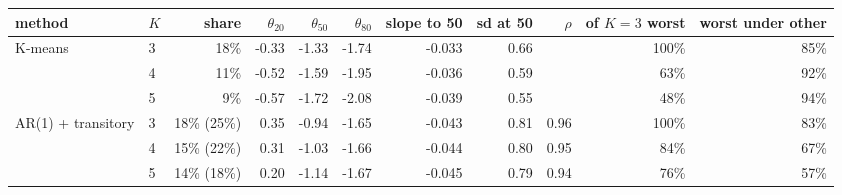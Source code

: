 \begin{tabular}{llrrrrrrrrr}
\toprule
method & $K$ & share & $\theta_{20}$ & $\theta_{50}$ & $\theta_{80}$ & slope to 50 & sd at 50 & $\rho$ & of $K{=}3$ worst & worst under other \\
\midrule
K-means & 3 & 18\% & -0.33 & -1.33 & -1.74 & -0.033 & 0.66 &  & 100\% & 85\% \\
 & 4 & 11\% & -0.52 & -1.59 & -1.95 & -0.036 & 0.59 &  & 63\% & 92\% \\
 & 5 & 9\% & -0.57 & -1.72 & -2.08 & -0.039 & 0.55 &  & 48\% & 94\% \\
\addlinespace
AR(1) + transitory & 3 & 18\% (25\%) & 0.35 & -0.94 & -1.65 & -0.043 & 0.81 & 0.96 & 100\% & 83\% \\
 & 4 & 15\% (22\%) & 0.31 & -1.03 & -1.66 & -0.044 & 0.80 & 0.95 & 84\% & 67\% \\
 & 5 & 14\% (18\%) & 0.20 & -1.14 & -1.67 & -0.045 & 0.79 & 0.94 & 76\% & 57\% \\
\bottomrule
\end{tabular}
